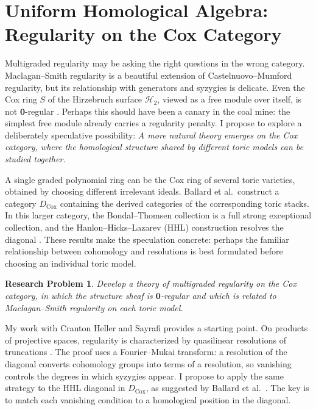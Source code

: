 \documentclass[11pt,reqno]{amsart}
\newtheorem{problem}[lemma]{Research Problem}
\theoremstyle{remark}
\newcommand{\zero}{\mathbf{0}}
\begin{document}
\section{Uniform Homological Algebra: Regularity on the Cox Category}
\label{sec:uniform-homological-algebra-on-toric}
Multigraded regularity may be asking the right questions in the wrong category. Maclagan--Smith regularity is a beautiful extension of Castelnuovo--Mumford regularity, but its relationship with generators and syzygies is delicate. Even the Cox ring $S$ of the Hirzebruch surface $\mathcal H_2$, viewed as a free module over itself, is not $\zero$-regular \cite[Example~4.3]{maclaganSmith04}. Perhaps this should have been a canary in the coal mine: the simplest free module already carries a regularity penalty. I propose to explore a deliberately speculative possibility: \emph{A more natural theory emerges on the Cox category, where the homological structure shared by different toric models can be studied together.}

A single graded polynomial ring can be the Cox ring of several toric varieties, obtained by choosing different irrelevant ideals. Ballard et al.\ construct a category $D_{\mathrm{Cox}}$ containing the derived categories of the corresponding toric stacks. In this larger category, the Bondal--Thomsen collection is a full strong exceptional collection, and the Hanlon--Hicks--Lazarev (HHL) construction resolves the diagonal \cite{longLiveKing,HHL24}. These results make the speculation concrete: perhaps the familiar relationship between cohomology and resolutions is best formulated before choosing an individual toric model.

\begin{problem}
Develop a theory of multigraded regularity on the Cox category, in which the structure sheaf is $\zero$-regular and which is related to Maclagan--Smith regularity on each toric model.
\end{problem}


My work with Cranton Heller and Sayrafi provides a starting point. On products of projective spaces, regularity is characterized by quasilinear resolutions of truncations \cite{bruceHellerSayrafi21}. The proof uses a Fourier--Mukai transform: a resolution of the diagonal converts cohomology groups into terms of a resolution, so vanishing controls the degrees in which syzygies appear. I propose to apply the same strategy to the HHL diagonal in $D_{\mathrm{Cox}}$, as suggested by Ballard et al.\ \cite[Remark~7.22]{longLiveKing}. The key is to match each vanishing condition to a homological position in the diagonal.
\end{document}
